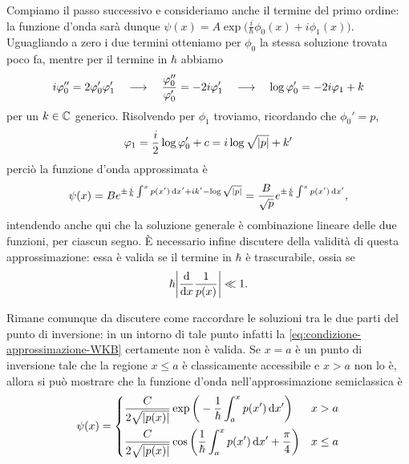Compiamo il passo successivo e consideriamo anche il termine del primo ordine: la funzione d'onda sarà dunque $\psi(x)=A\exp\big(\frac{i}{\hbar}\phi_0(x)+i\phi_1(x)\big)$.
Uguagliando a zero i due termini otteniamo per $\phi_0$ la stessa soluzione trovata poco fa, mentre per il termine in $\hbar$ abbiamo
\begin{equation}
	i\varphi_0''=2\varphi_0'\varphi_1'\quad\longrightarrow\quad \frac{\varphi_0''}{\varphi_0'}=-2i\varphi_1'\quad\longrightarrow\quad \log\varphi_0'=-2i\varphi_1+k
\end{equation}
per un $k\in\mathbb{C}$ generico.
Risolvendo per $\phi_1$ troviamo, ricordando che $\phi_0'=p$,
\begin{equation}
	\varphi_1=\frac{i}2\log\varphi_0'+c=i\log\sqrt{\lvert p\rvert}+k'
\end{equation}
perciò la funzione d'onda approssimata è
\begin{equation}
	\psi(x)=Be^{\pm\frac{i}{\hbar}\int^xp(x')\,\dd x'+ik'-\log\sqrt{\abs{p}}}=\frac{B}{\sqrt{p}}e^{\pm\frac{i}{\hbar}\int^xp(x')\,\dd x'},
	\label{eq:soluzione-WKB-ordine-1}
\end{equation}
intendendo anche qui che la soluzione generale è combinazione lineare delle due funzioni, per ciascun segno.
È necessario infine discutere della validità di questa approssimazione: essa è valida se il termine in $\hbar$ è trascurabile, ossia se
\begin{equation}
    \hbar\abs[\bigg]{\drv{}{x}\frac1{p(x)}}\ll 1.
	\label{eq:condizione-approssimazione-WKB}
\end{equation}

Rimane comunque da discutere come raccordare le soluzioni tra le due parti del punto di inversione: in un intorno di tale punto infatti la \eqref{eq:condizione-approssimazione-WKB} certamente non è valida.
Se $x=a$ è un punto di inversione tale che la regione $x\le a$ è classicamente accessibile e $x>a$ non lo è, allora si può mostrare che la funzione d'onda nell'approssimazione semiclassica è
\begin{equation}
	\psi(x)=
	\begin{dcases}
		\frac{C}{2\sqrt{\abs{p(x)}}}\exp\bigg(-\frac1{\hbar}\int_a^xp(x')\,\dd x'\bigg)				&x>a\\
		\frac{C}{2\sqrt{\abs{p(x)}}}\cos\bigg(\frac1{\hbar}\int_a^xp(x')\,\dd x'+\frac{\pi}4\bigg)	&x\le a
	\end{dcases}
	\label{eq:wf-semiclassica}
\end{equation}

